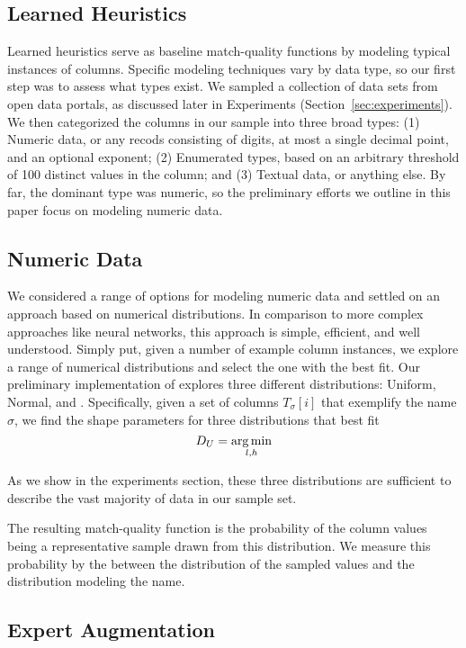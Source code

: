 \subsection{Learned Heuristics}
Learned heuristics serve as baseline match-quality functions by modeling typical instances of columns.
Specific modeling techniques vary by data type, so our first step was to assess what types exist.
We sampled a collection of \placeholder{\#\#\#} data sets from open data portals, as discussed later in Experiments (Section~\ref{sec:experiments}).
We then categorized the \placeholder{\#\#\#} columns in our sample into three broad types: 
(1) Numeric data, or any recods consisting of digits, at most a single decimal point, and an optional exponent; 
(2) Enumerated types, based on an arbitrary threshold of 100 distinct values in the column; and 
(3) Textual data, or anything else.  
By far, the dominant type was numeric, so the preliminary efforts we outline in this paper focus on modeling numeric data.

\subsection{Numeric Data}
We considered a range of options for modeling numeric data and settled on an approach based on numerical distributions.
In comparison to more complex approaches like neural networks, this approach is simple, efficient, and well understood.
Simply put, given a number of example column instances, we explore a range of numerical distributions and select the one with the best fit.
Our preliminary implementation of \systemname explores three different distributions: Uniform, Normal, and .  
Specifically, given a set of columns $T_\sigma[i]$ that exemplify the name $\sigma$, we find the shape parameters for three distributions that best fit
$$D_{U} = \operatorname*{arg\,min}_{l, h} $$



As we show in the experiments section, these three distributions are sufficient to describe the vast majority of data in our sample set.


The resulting match-quality function is the probability of the column values being a representative sample drawn from this distribution.
We measure this probability by the  between the distribution of the sampled values and the distribution modeling the name.


\subsection{Expert Augmentation}


